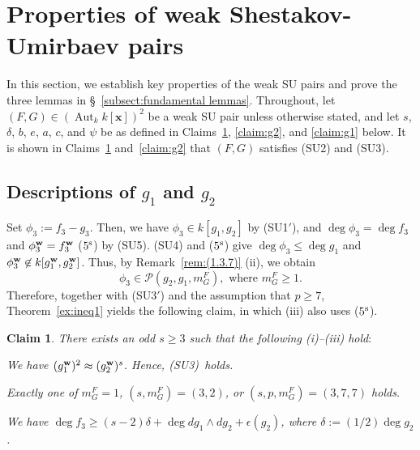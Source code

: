 \documentclass{amsart}
\theoremstyle{plain}
\newtheorem{claim}{Claim}
\theoremstyle{definition}
\newcommand{\Aut }{\mathop{\mathrm{Aut}}\nolimits}
\newcommand{\nd}{\noindent}
\newcommand{\ep}{\epsilon}
\newcommand{\x}{{\boldsymbol x}}
\newcommand{\w}{{\bf w}}
\newcommand{\kx}{k[\x]}
\begin{document}
\section{Properties of weak Shestakov-Umirbaev pairs}\label{sect:WSU}
\setcounter{equation}{0}

In this section, 
we establish key properties of the weak SU pairs 
and prove the three lemmas in \S~\ref{subsect:fundamental lemmas}. 
Throughout, 
let $(F,G)\in (\Aut _k\kx )^2$ be a weak SU pair 
unless otherwise stated, 
and let $s$, $\delta $, 
$b$, $e$, $a$, $c$, and $\psi $ 
be as defined in Claims~\ref{claim:A}, \ref{claim:g2}, 
and \ref{claim:g1} below. 
It is shown in Claims~\ref{claim:A} and~\ref{claim:g2} 
that $(F,G)$ satisfies (SU2) and (SU3). 





\subsection{Descriptions of $g_1$ and $g_2$}\label{subsect:g1g2}


Set $\phi _3:=f_3-g_3$. 
Then, we have $\phi _3\in k[g_1,g_2]$ by (SU1$'$), 
and $\deg \phi _3=\deg f_3$ and 
$\phi _3^{\w }=f_3^{\w }$ ($5^{\rm s}$) by (SU5). 
(SU4) and ($5^{\rm s}$) give 
$\deg \phi _3\le \deg g_1$ and 
$\phi _3^{\w }\not\in k[g_1^{\w },g_2^{\w }]$. 
Thus, by Remark~\ref{rem:(1.3.7)} (ii), 
we obtain 
\begin{equation}\label{eq:m(F,G)}
\phi _3\in \mathcal{P}(g_2,g_1,m_G^F), 
\text{ \ where \ } 
m_G^F\ge 1. 
\end{equation}
Therefore, 
together with (SU3$'$) and the assumption that $p\ge 7$, 
Theorem~\ref{ex:ineq1} yields the following claim, 
in which (iii) also uses ($5^{\rm s}$). 



\begin{claim}\label{claim:A}
There exists an odd $s\ge 3$ such that the following 
{\rm (i)}--{\rm (iii)} hold$:$ 


\nd{\rm (i)} 
We have $(g_1^{\w })^2\approx (g_2^{\w })^s$. 
Hence, {\rm (SU3)}~holds. 



\nd{\rm (ii)} 
Exactly one of 
$m_G^F=1$, 
$(s,m_G^F)=(3,2)$, 
or $(s,p,m_G^F)=(3,7,7)$ holds. 


\nd{\rm (iii)} 
We have 
$\deg f_3\ge (s-2)\delta +\deg dg_1\wedge dg_2+\ep (g_2)$, 
where $\delta :=(1/2)\deg g_2$. 
\end{claim}
\end{document}
